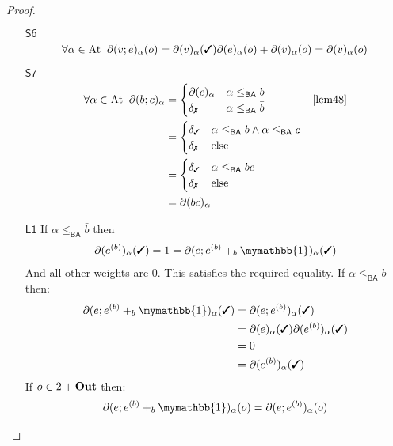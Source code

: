 \documentclass[a4paper,UKenglish,cleveref, autoref, thm-restate]{lipics-v2021}
\newcommand{\cmark}{\text{\ding{51}}}
\newcommand{\xmark}{\text{\ding{55}}}
\newcommand{\Out}{\textbf{\upshape{Out}}}
\newcommand{\At}{\text{\upshape{At}}}
\newcommand{\BA}{\textsf{BA}}
\newcommand{\Ax}[1]{\ensuremath{\mathsf{#1}}}
\newcommand{\bskip}{\mymathbb{1}}
\theoremstyle{plain}\newtheoremrep{thm}{Theorem}[section]
\begin{document}
\begin{toappendix}
\begin{proof}
\begin{enumerate}
				\item[\Ax{S6}]
				\begin{align*}
					\forall \alpha \in \At\;\;\partial(v;e)_\alpha(o) = \partial(v)_\alpha(\cmark)\partial(e)_\alpha(o) + \partial(v)_\alpha(o) = \partial(v)_\alpha(o)
				\end{align*}
				\item[\Ax{S7}]
				\begin{align*}
					\forall \alpha \in \At\;\;\partial(b;c)_\alpha &= \begin{cases}
						\partial(c)_\alpha & \alpha \leq_{\BA} b\\
						\delta_{\xmark} & \alpha \leq_{\BA} \bar b\\
					\end{cases} &\cref{lem48}\\ 
					&= \begin{cases}
						\delta_\cmark & \alpha \leq_{\BA} b \land \alpha \leq_{\BA} c\\
						\delta_{\xmark} & \text{else}\\
					\end{cases}\\
					&= \begin{cases}
						\delta_\cmark & \alpha \leq_{\BA} bc \\
						\delta_{\xmark} & \text{else}\\
					\end{cases}\\
					&= \partial(bc)_\alpha
				\end{align*}
				\item[\Ax{L1}]
				If $\alpha \leq_{\BA} \bar b$ then
				\begin{align*}
					\partial(e^{(b)})_\alpha(\cmark) = 1 = \partial(e;e^{(b)}+_b \bskip)_\alpha(\cmark) 
				\end{align*}
				And all other weights are $0$.
				This satisfies the required equality.
				If $\alpha \leq_{\BA} b$ then:
				\begin{align*}
					\partial(e;e^{(b)}+_b \bskip)_\alpha(\cmark) &= \partial(e;e^{(b)})_\alpha(\cmark)\\
					&= \partial(e)_\alpha(\cmark)\partial(e^{(b)})_\alpha(\cmark)\\
					&= 0\\
					&= \partial(e^{(b)})_\alpha(\cmark)
				\end{align*}
				If $o \in 2 + \Out$ then:
				\begin{align*}
					\partial(e;e^{(b)}+_b \bskip)_\alpha(o) &= \partial(e;e^{(b)})_\alpha(o)\\

\end{align*}
\end{enumerate}
\end{proof}
\end{toappendix}
\end{document}
